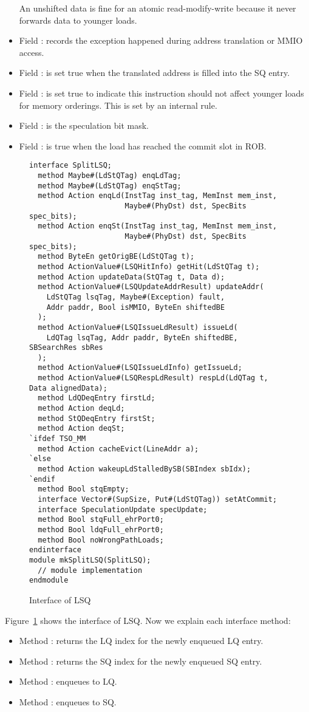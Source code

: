 \begin{itemize}
    An unshifted data is fine for an atomic read-modify-write because it never forwards data to younger loads.
    \item Field : records the exception happened during address translation or MMIO access.
    \item Field : is set true when the translated address is filled into the SQ entry.
    \item Field : is set true to indicate this instruction should not affect younger loads for memory orderings.
    This is set by an internal rule.
    \item Field : is the speculation bit mask.
    \item Field : is true when the load has reached the commit slot in ROB.
\end{itemize}

\begin{figure}
\begin{lstlisting}[caption={}]
interface SplitLSQ;
  method Maybe#(LdStQTag) enqLdTag;
  method Maybe#(LdStQTag) enqStTag;
  method Action enqLd(InstTag inst_tag, MemInst mem_inst,
                      Maybe#(PhyDst) dst, SpecBits spec_bits);
  method Action enqSt(InstTag inst_tag, MemInst mem_inst,
                      Maybe#(PhyDst) dst, SpecBits spec_bits);
  method ByteEn getOrigBE(LdStQTag t);
  method ActionValue#(LSQHitInfo) getHit(LdStQTag t);
  method Action updateData(StQTag t, Data d);
  method ActionValue#(LSQUpdateAddrResult) updateAddr(
    LdStQTag lsqTag, Maybe#(Exception) fault,
    Addr paddr, Bool isMMIO, ByteEn shiftedBE
  );
  method ActionValue#(LSQIssueLdResult) issueLd(
    LdQTag lsqTag, Addr paddr, ByteEn shiftedBE, SBSearchRes sbRes
  );
  method ActionValue#(LSQIssueLdInfo) getIssueLd;
  method ActionValue#(LSQRespLdResult) respLd(LdQTag t, Data alignedData);
  method LdQDeqEntry firstLd;
  method Action deqLd;
  method StQDeqEntry firstSt;
  method Action deqSt;
`ifdef TSO_MM
  method Action cacheEvict(LineAddr a);
`else
  method Action wakeupLdStalledBySB(SBIndex sbIdx);
`endif
  method Bool stqEmpty;
  interface Vector#(SupSize, Put#(LdStQTag)) setAtCommit;
  interface SpeculationUpdate specUpdate;
  method Bool stqFull_ehrPort0;
  method Bool ldqFull_ehrPort0;
  method Bool noWrongPathLoads;
endinterface
module mkSplitLSQ(SplitLSQ);
  // module implementation
endmodule
\end{lstlisting}
\caption{Interface of LSQ}\label{fig:lsq-ifc}
\end{figure}

Figure~\ref{fig:lsq-ifc} shows the interface of LSQ.
Now we explain each interface method:
\begin{itemize}
    \item Method : returns the LQ index for the newly enqueued LQ entry.
    \item Method : returns the SQ index for the newly enqueued SQ entry.
    \item Method : enqueues to LQ.
    \item Method : enqueues to SQ.
\end{itemize}
